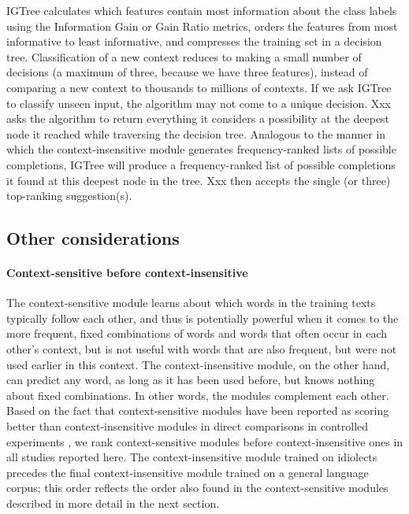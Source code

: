 \documentclass[11pt]{article}
\begin{document}
IGTree calculates which features contain most information about the class labels using the Information Gain or Gain Ratio metrics, orders the features from most informative to least informative, and compresses the training set in a decision tree. Classification of a new context reduces to making a small number of decisions (a maximum of three, because we have three features), instead of comparing a new context to thousands to millions of contexts. If we ask IGTree to classify unseen input, the algorithm may not come to a unique decision. Xxx asks the algorithm to return everything it considers a possibility at the deepest node it reached while traversing the decision tree. Analogous to the manner in which the context-insensitive module generates frequency-ranked lists of possible completions, IGTree will produce a frequency-ranked list of possible completions it found at this deepest node in the tree. Xxx then accepts the single (or three) top-ranking suggestion(s).

\subsection{Other considerations}

\paragraph{Context-sensitive before context-insensitive}

The context-sensitive module learns about which words in the training texts typically follow each other, and thus is potentially powerful when it comes to the more frequent, fixed combinations of words and words that often occur in each other's context, but is not useful with words that are also frequent, but were not used earlier in this context. The context-insensitive module, on the other hand, can predict any word, as long as it has been used before, but knows nothing about fixed combinations. In other words, the modules complement each other. Based on the fact that context-sensitive modules have been reported as scoring better than context-insensitive modules in direct comparisons in controlled experiments \cite{Lesher+99}, we rank context-sensitive modules before context-insensitive ones in all studies reported here. The context-insensitive module trained on idiolects precedes the final context-insensitive module trained on a general language corpus; this order reflects the order also found in the context-sensitive modules described in more detail in the next section.
\end{document}
